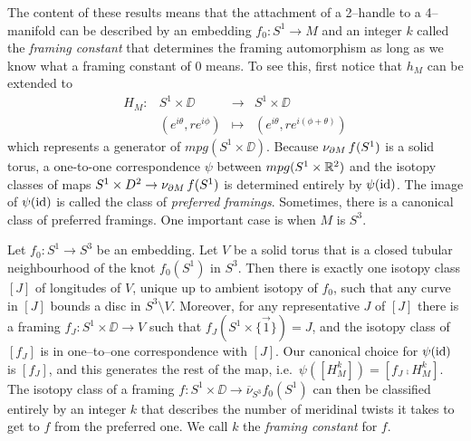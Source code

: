 The content of these results means that the attachment of a 2--handle to a 4--manifold can be described by an embedding $f_0:S^1\to M$ and an integer $k$ called the \emph{framing constant} that determines the framing automorphism as long as we know what a framing constant of $0$ means.
To see this, first notice that $h_M$ can be extended to
\[
	\begin{array}{cccc}
		H_M: & S^1\times\DD & \to & S^1\times\DD \\
			& (e^{i\theta}, re^{i\phi}) & \mapsto & (e^{i\theta},re^{i(\phi+\theta)})	
	\end{array}
\]
which represents a generator of $mpg(S^1\times\DD)$.
Because $\nu_{\partial M}\,f(S^1)$ is a solid torus, a one-to-one correspondence
$\psi$ between $mpg(S^1\times\mathbb{R}^2)$ and the isotopy classes of maps $S^1\times D^2\to\nu_{\partial M}\,f(S^1)$ is determined entirely by $\psi(\mathrm{id})$.
The image of $\psi(\mathrm{id})$ is called the class of \emph{preferred framings}.
Sometimes, there is a canonical class of preferred framings.
One important case is when $M$ is $S^3$.

Let $f_0:S^1\to S^3$ be an embedding.
Let $V$ be a solid torus that is a closed tubular neighbourhood of the knot $f_0(S^1)$ in $S^3$.
Then there is exactly one isotopy class $[J]$ of longitudes of $V$, unique up to ambient isotopy of $f_0$, such that any curve in $[J]$ bounds a disc in $S^3\setminus V$.
Moreover, for any representative $J$ of $[J]$ there is a framing $f_J:S^1\times\DD\to V$ such that $f_J(S^1\times\{\vec{1}\})=J$, and the isotopy class of $[f_J]$ is in one--to--one correspondence with $[J]$.
Our canonical choice for $\psi(\mathrm{id})$ is $[f_J]$, and this generates the rest of the map, i.e.\ $\psi([H_M^k])=[f_J\comp H_M^k]$.
The isotopy class of a framing $f:S^1\times\DD\to\overline{\nu}_{S^3}f_0(S^1)$ can then be classified entirely by an integer $k$ that describes the number of meridinal twists it takes to get to $f$ from the preferred one.
We call $k$ the \emph{framing constant} for $f$.
